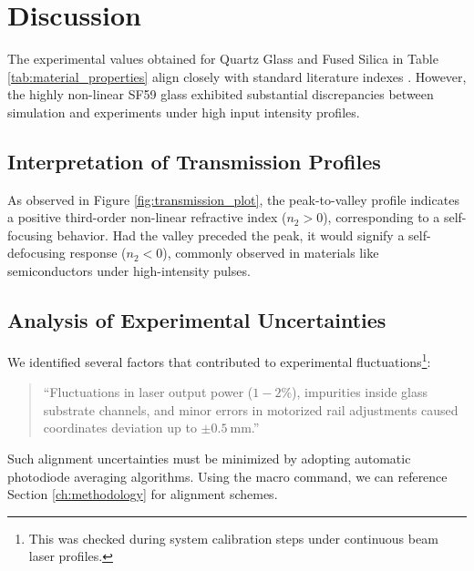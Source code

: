 %

\chapter{Discussion}
\label{ch:discussion}

The experimental values obtained for Quartz Glass and Fused Silica in Table \ref{tab:material_properties} align closely with standard literature indexes \cite{boyd2020nonlinear}. However, the highly non-linear SF59 glass exhibited substantial discrepancies between simulation and experiments under high input intensity profiles.

\section{Interpretation of Transmission Profiles}
As observed in Figure \ref{fig:transmission_plot}, the peak-to-valley profile indicates a positive third-order non-linear refractive index ($n_2 > 0$), corresponding to a self-focusing behavior. Had the valley preceded the peak, it would signify a self-defocusing response ($n_2 < 0$), commonly observed in materials like semiconductors under high-intensity pulses.

\section{Analysis of Experimental Uncertainties}
We identified several factors that contributed to experimental fluctuations\footnote{This was checked during system calibration steps under continuous beam laser profiles.}:
\begin{quote}
    ``Fluctuations in laser output power ($1-2\%$), impurities inside glass substrate channels, and minor errors in motorized rail adjustments caused coordinates deviation up to $\pm \SI{0.5}{\milli\meter}$.''
\end{quote}
Such alignment uncertainties must be minimized by adopting automatic photodiode averaging algorithms.
Using the macro command, we can reference Section \ref{ch:methodology} for alignment schemes.
